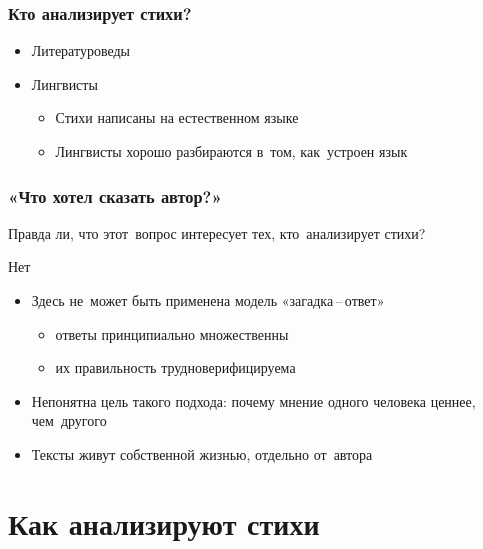 \documentclass{beamer}
\begin{document}

\begin{frame}
\frametitle{Кто анализирует стихи?}

\begin{itemize}
\item Литературоведы
\item Лингвисты
\begin{itemize}
\item Стихи написаны на естественном языке
\item Лингвисты хорошо разбираются в~том, как~устроен язык
\end{itemize}
\end{itemize}

\end{frame}


\begin{frame}
\frametitle{«Что хотел сказать автор?»}

Правда ли, что этот~вопрос интересует тех, кто~анализирует стихи?

\begin{center}

{\Large Нет}

\end{center}

\begin{itemize}
\item Здесь не~может быть применена модель «загадка\,--\,ответ»
\begin{itemize}
\item ответы принципиально множественны 
\item их правильность трудноверифицируема
\end{itemize} 
\item Непонятна цель такого подхода: почему мнение одного человека ценнее, чем~другого
\item Тексты живут собственной жизнью, отдельно от~автора
\end{itemize}

\end{frame}


\section{Как анализируют стихи}\label{sec:main2}
\end{document}
